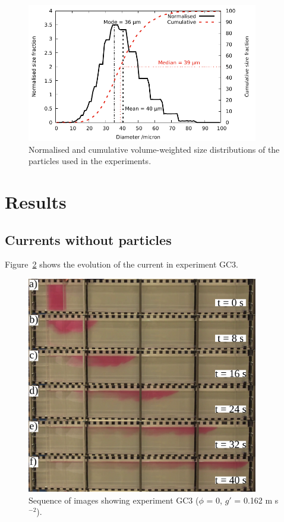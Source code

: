 \documentclass[authoryear,preprint,review,12pt]{elsarticle}
\begin{document}
\begin{figure}[ht!]
  \centerline{\includegraphics[width=0.9\textwidth]{unsieved_dist.pdf}}
  \caption{Normalised and cumulative volume-weighted size distributions of the particles used in the experiments.}
  \label{fig:size_dist}
\end{figure}

\section{Results}
\label{sec:res}

\subsection{Currents without particles}
\label{subsec:res_no_parts}

Figure~\ref{fig:GC3} shows the evolution of the current in experiment GC3.

\begin{figure}[ht!]
  \centerline{\includegraphics[width=0.9\textwidth]{GC3.pdf}}
  \caption{Sequence of images showing experiment GC3 ($\phi$ = 0, $g\prime$ = 0.162 m s$^{-2}$). }
  \label{fig:GC3}
\end{figure}
\end{document}
